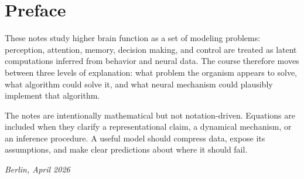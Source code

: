 \section*{Preface}

These notes study higher brain function as a set of modeling problems: perception, attention, memory, decision making, and control are treated as latent computations inferred from behavior and neural data. The course therefore moves between three levels of explanation: what problem the organism appears to solve, what algorithm could solve it, and what neural mechanism could plausibly implement that algorithm.

The notes are intentionally mathematical but not notation-driven. Equations are included when they clarify a representational claim, a dynamical mechanism, or an inference procedure. A useful model should compress data, expose its assumptions, and make clear predictions about where it should fail.

\bigskip
\noindent\textit{Berlin, April 2026}
